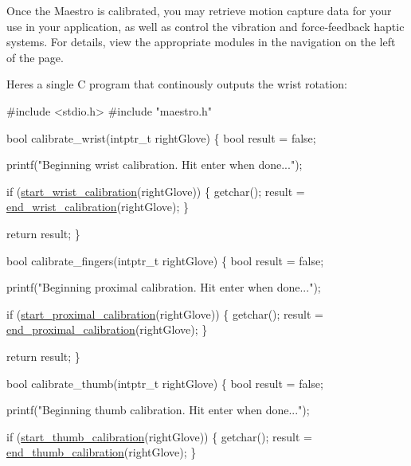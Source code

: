 Once the Maestro is calibrated, you may retrieve motion capture data for your use in your application, as well as control the vibration and force-\/feedback haptic systems. For details, view the appropriate modules in the navigation on the left of the page.

Here\textquotesingle{}s a single C program that continously outputs the wrist rotation\+:


\begin{DoxyCode}
\textcolor{preprocessor}{#include <stdio.h>}
\textcolor{preprocessor}{#include "maestro.h"}

\textcolor{keywordtype}{bool} calibrate\_wrist(intptr\_t rightGlove)
\{
    \textcolor{keywordtype}{bool} result = \textcolor{keyword}{false};

    printf(\textcolor{stringliteral}{"Beginning wrist calibration. Hit enter when done..."});

    \textcolor{keywordflow}{if} (\hyperlink{group__glove_calibration_ga7a6d895e59fe7a4f554b05ab067087cc}{start\_wrist\_calibration}(rightGlove)) \{
        getchar();
        result = \hyperlink{group__glove_calibration_ga4528575643eb59c92277338516679588}{end\_wrist\_calibration}(rightGlove);
    \}

    \textcolor{keywordflow}{return} result;
\}

\textcolor{keywordtype}{bool} calibrate\_fingers(intptr\_t rightGlove)
\{
    \textcolor{keywordtype}{bool} result = \textcolor{keyword}{false};

    printf(\textcolor{stringliteral}{"Beginning proximal calibration. Hit enter when done..."});

    \textcolor{keywordflow}{if} (\hyperlink{group__glove_calibration_ga8aa9f0c942b42299bc16440ce3d2c785}{start\_proximal\_calibration}(rightGlove)) \{
        getchar();
        result = \hyperlink{group__glove_calibration_gaca292cd71d6b63a803381ba9a43c3d85}{end\_proximal\_calibration}(rightGlove);
    \}

    \textcolor{keywordflow}{return} result;
\}

\textcolor{keywordtype}{bool} calibrate\_thumb(intptr\_t rightGlove)
\{
    \textcolor{keywordtype}{bool} result = \textcolor{keyword}{false};

    printf(\textcolor{stringliteral}{"Beginning thumb calibration. Hit enter when done..."});

    \textcolor{keywordflow}{if} (\hyperlink{group__glove_calibration_ga8d3e246642b4dbb70be016ad320cc320}{start\_thumb\_calibration}(rightGlove)) \{
        getchar();
        result = \hyperlink{group__glove_calibration_gaab1a5c7b6a32fa01bfad60f964065355}{end\_thumb\_calibration}(rightGlove);
    \}


\end{DoxyCode}
